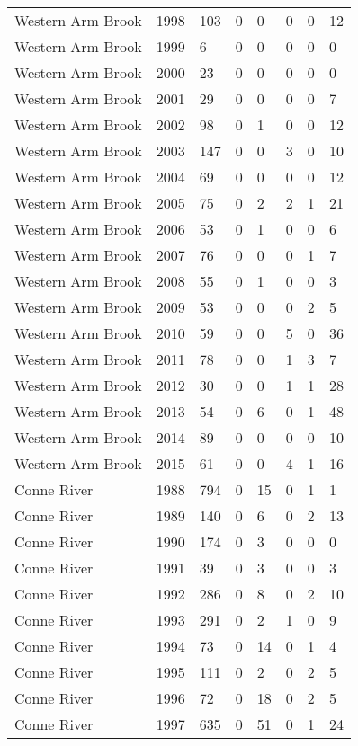 \begin{longtable}{p{3cm}p{1cm}p{1.3cm}p{1.3cm}p{1.3cm}p{1.3cm}p{1.3cm}p{1.3cm}}
  Western Arm Brook & 1998 & 103 & 0 & 0 & 0 & 0 & 12 \\ 
  Western Arm Brook & 1999 & 6 & 0 & 0 & 0 & 0 & 0 \\ 
  Western Arm Brook & 2000 & 23 & 0 & 0 & 0 & 0 & 0 \\ 
  Western Arm Brook & 2001 & 29 & 0 & 0 & 0 & 0 & 7 \\ 
  Western Arm Brook & 2002 & 98 & 0 & 1 & 0 & 0 & 12 \\ 
  Western Arm Brook & 2003 & 147 & 0 & 0 & 3 & 0 & 10 \\ 
  Western Arm Brook & 2004 & 69 & 0 & 0 & 0 & 0 & 12 \\ 
  Western Arm Brook & 2005 & 75 & 0 & 2 & 2 & 1 & 21 \\ 
  Western Arm Brook & 2006 & 53 & 0 & 1 & 0 & 0 & 6 \\ 
  Western Arm Brook & 2007 & 76 & 0 & 0 & 0 & 1 & 7 \\ 
  Western Arm Brook & 2008 & 55 & 0 & 1 & 0 & 0 & 3 \\ 
  Western Arm Brook & 2009 & 53 & 0 & 0 & 0 & 2 & 5 \\ 
  Western Arm Brook & 2010 & 59 & 0 & 0 & 5 & 0 & 36 \\ 
  Western Arm Brook & 2011 & 78 & 0 & 0 & 1 & 3 & 7 \\ 
  Western Arm Brook & 2012 & 30 & 0 & 0 & 1 & 1 & 28 \\ 
  Western Arm Brook & 2013 & 54 & 0 & 6 & 0 & 1 & 48 \\ 
  Western Arm Brook & 2014 & 89 & 0 & 0 & 0 & 0 & 10 \\ 
  Western Arm Brook & 2015 & 61 & 0 & 0 & 4 & 1 & 16 \\ 
  Conne River & 1988 & 794 & 0 & 15 & 0 & 1 & 1 \\ 
  Conne River & 1989 & 140 & 0 & 6 & 0 & 2 & 13 \\ 
  Conne River & 1990 & 174 & 0 & 3 & 0 & 0 & 0 \\ 
  Conne River & 1991 & 39 & 0 & 3 & 0 & 0 & 3 \\ 
  Conne River & 1992 & 286 & 0 & 8 & 0 & 2 & 10 \\ 
  Conne River & 1993 & 291 & 0 & 2 & 1 & 0 & 9 \\ 
  Conne River & 1994 & 73 & 0 & 14 & 0 & 1 & 4 \\ 
  Conne River & 1995 & 111 & 0 & 2 & 0 & 2 & 5 \\ 
  Conne River & 1996 & 72 & 0 & 18 & 0 & 2 & 5 \\ 
  Conne River & 1997 & 635 & 0 & 51 & 0 & 1 & 24 \\ 

\end{longtable}
